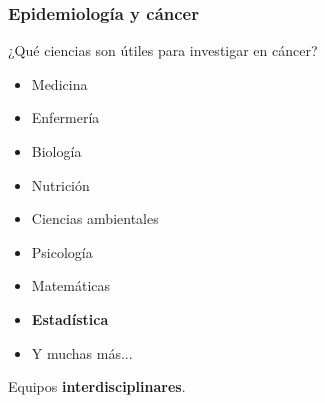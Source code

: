 \documentclass{beamer}
\begin{document}

\begin{frame}\frametitle{Epidemiología y cáncer}
	\begin{block}{¿Qué ciencias son útiles para investigar en cáncer?}
		\begin{itemize}
			\item Medicina
			\item Enfermería
			\item Biología
			\item Nutrición
			\item Ciencias ambientales
			\item Psicología
			\item Matemáticas
			\item \textbf{\large{Estadística}}
			\item Y muchas más...
		\end{itemize}
		Equipos \textbf{interdisciplinares}.
	\end{block}
\end{frame}

\end{document}
